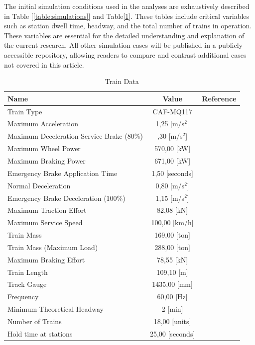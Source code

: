 \documentclass[conference]{IEEEtran}
\begin{document}
The initial simulation conditions used in the analyses are exhaustively described in Table [\ref{table:simulations}] and Table[\ref{table:train_data}]. These tables include critical variables such as station dwell time, headway, and the total number of trains in operation. These variables are essential for the detailed understanding and explanation of the current research. All other simulation cases will be published in a publicly accessible repository, allowing readers to compare and contrast additional cases not covered in this article.\cite{b12} 
\begin{table}[htbp]
\caption{Train Data}
\label{table:train_data}
\centering
\begin{tabular}{|p{4.5cm}|c|c|}
\hline
\rowcolor[gray]{0.9}
\centering Name & Value & \scriptsize Reference \\ 
\hline
Train Type & \scriptsize CAF-MQ117 & \cite{b10} \\
\hline
Maximum Acceleration & 1,25 [\scriptsize m/s$^2$]  & \cite{b11}  \\
\hline
Maximum Deceleration Service Brake \scriptsize(80\%)  & \centering 1,30 [\scriptsize m/s$^2$] & \cite{b11} \\
\hline
Maximum Wheel Power  & 570,00 [\scriptsize kW] & \cite{b12} \\
\hline
Maximum Braking Power  & 671,00 [\scriptsize kW] & \cite{b12} \\
\hline
Emergency Brake Application Time  & 1,50 [\scriptsize seconds] & \cite{b11} \\
\hline
Normal Deceleration & 0,80 [\scriptsize m/s$^2$]  & \cite{b11} \\
\hline
Emergency Brake Deceleration \scriptsize(100\%) & 1,15 [\scriptsize m/s$^2$]  & \cite{b11} \\
\hline
Maximum Traction Effort  & 82,08 [\scriptsize kN] & \cite{b12} \\
\hline
Maximum Service Speed & 100,00 [\scriptsize km/h] & \cite{b11} \\
\hline
Train Mass & 169,00 [\scriptsize ton]& \cite{b11} \\
\hline
Train Mass (Maximum Load) & 288,00 [\scriptsize ton] & \cite{b11} \\
\hline
Maximum Braking Effort & 78,55 [\scriptsize kN] & \cite{b12} \\
\hline
Train Length & 109,10 [\scriptsize m] & \cite{b11} \\
\hline
Track Gauge & 1435,00 \scriptsize[mm] & \cite{b11} \\
\hline
Frequency  & 60,00 \scriptsize[Hz] & \cite{b13} \\
\hline
Minimum Theoretical Headway  & 2 [\scriptsize min]& \cite{b14} \\
\hline
Number of Trains  & 18,00 [\scriptsize units] & \cite{b14} \\
\hline
Hold time at stations & 25,00 [\scriptsize seconds] & \cite{b15} \\
\hline
\end{tabular}
\end{table}
\end{document}
